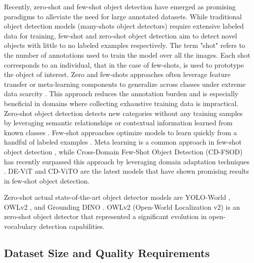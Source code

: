 \documentclass{article}
\begin{document}
Recently, zero-shot and few-shot object detection have emerged as promising paradigms
to alleviate the need for large annotated datasets.
While traditional object detection models (many-shots object detectors) require extensive labeled data for training, 
few-shot and zero-shot object detection aim to detect novel objects with little to 
no labeled examples respectively. The term "shot" refers to the number of annotations 
used to train the model over all the images. Each shot corresponds to an individual, 
that in the case of few-shots, is used to prototype the object of interest.
Zero and few-shots approaches often leverage feature transfer or meta-learning components to generalize 
across classes under extreme data scarcity \cite{liMetaSGDLearningLearn2017}. This approach reduces the annotation 
burden and is especially beneficial in domains where collecting exhaustive training 
data is impractical.
Zero-shot object detection detects new categories without any training samples by 
leveraging semantic relationships or contextual information learned from known classes \cite{bansalZeroShotObjectDetection2018}. 
Few-shot approaches optimize models to learn quickly from a handful of labeled examples \cite{huangSurveySelfSupervisedFewShot2022}.
Meta learning is a common approach in few-shot object detection 
\cite{MetaLearningBasedIncrementalFewShot,wuMetaRCNNMetaLearning2020,fuMetaSSDFastAdaptation2019,zhangMetaDETRFewShotObject2021}, 
while Cross-Domain Few-Shot Object Detection (CD-FSOD) has recently surpassed this
approach by leveraging domain adaptation techniques \cite{saBroaderStudyCrossdomain2023}.
DE-ViT \cite{xuDeViTDecomposingVision2023} and CD-ViTO \cite{fuCrossDomainFewShotObject2024}  
are the latest models that have shown promising results in few-shot object detection.

Zero-shot actual state-of-the-art object detector models are YOLO-World \cite{kangFewshotObjectDetection2019}, 
OWLv2 \cite{mindererScalingOpenVocabularyObject2023}, and Grounding DINO \cite{liuGroundingDINOMarrying2025}.
OWLv2 (Open-World Localization v2) is an zero-shot object detector that represented a significant 
evolution in open-vocabulary detection capabilities.

\subsection*{Dataset Size and Quality Requirements}
\end{document}

